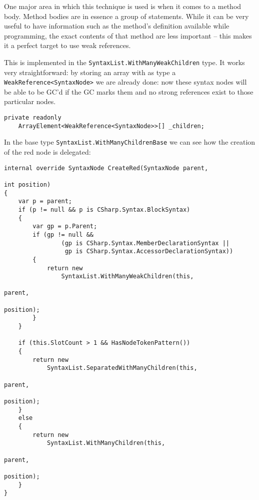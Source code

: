 One major area in which this technique is used is when it comes to a method body. Method bodies are in essence a group of statements. While it can be very useful to have information such as the method's definition available while programming, the exact contents of that method are less important -- this makes it a perfect target to use weak references.

This is implemented in the \texttt{SyntaxList.WithManyWeakChildren} type. It works very straightforward: by storing an array with as type a \texttt{WeakReference<SyntaxNode>} we are already done: now these syntax nodes will be able to be GC'd if the GC marks them and no strong references exist to those particular nodes.

\begin{lstlisting}
private readonly 
	ArrayElement<WeakReference<SyntaxNode>>[] _children;
\end{lstlisting}

\noindent In the base type \texttt{SyntaxList.WithManyChildrenBase} we can see how the creation of the red node is delegated:

\begin{lstlisting}
internal override SyntaxNode CreateRed(SyntaxNode parent, 
																			 int position)
{
	var p = parent;
	if (p != null && p is CSharp.Syntax.BlockSyntax)
	{
		var gp = p.Parent;
		if (gp != null && 
				(gp is CSharp.Syntax.MemberDeclarationSyntax || 
				 gp is CSharp.Syntax.AccessorDeclarationSyntax))
		{
			return new 
				SyntaxList.WithManyWeakChildren(this, 
																				parent, 
																				position);
		}
	}

	if (this.SlotCount > 1 && HasNodeTokenPattern())
	{
		return new 
			SyntaxList.SeparatedWithManyChildren(this, 
																					 parent, 
																					 position);
	}
	else
	{
		return new 
			SyntaxList.WithManyChildren(this, 
																	parent, 
																	position);
	}
}
\end{lstlisting}
